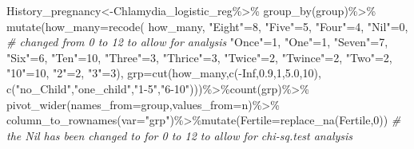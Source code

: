 \documentclass[
]{article}
\newenvironment{Shaded}{\begin{snugshade}}{\end{snugshade}}
\newcommand{\AttributeTok}[1]{\textcolor[rgb]{0.77,0.63,0.00}{#1}}
\newcommand{\CommentTok}[1]{\textcolor[rgb]{0.56,0.35,0.01}{\textit{#1}}}
\newcommand{\ConstantTok}[1]{\textcolor[rgb]{0.00,0.00,0.00}{#1}}
\newcommand{\DecValTok}[1]{\textcolor[rgb]{0.00,0.00,0.81}{#1}}
\newcommand{\FloatTok}[1]{\textcolor[rgb]{0.00,0.00,0.81}{#1}}
\newcommand{\FunctionTok}[1]{\textcolor[rgb]{0.00,0.00,0.00}{#1}}
\newcommand{\NormalTok}[1]{#1}
\newcommand{\OtherTok}[1]{\textcolor[rgb]{0.56,0.35,0.01}{#1}}
\newcommand{\SpecialCharTok}[1]{\textcolor[rgb]{0.00,0.00,0.00}{#1}}
\newcommand{\StringTok}[1]{\textcolor[rgb]{0.31,0.60,0.02}{#1}}
\begin{document}
\begin{Shaded}
\begin{Highlighting}[]
\NormalTok{History\_pregnancy}\OtherTok{\textless{}{-}}\NormalTok{Chlamydia\_logistic\_reg}\SpecialCharTok{\%\textgreater{}\%}
 \FunctionTok{group\_by}\NormalTok{(group)}\SpecialCharTok{\%\textgreater{}\%}
  \FunctionTok{mutate}\NormalTok{(}\AttributeTok{how\_many=}\FunctionTok{recode}\NormalTok{(}
\NormalTok{    how\_many,}
    \StringTok{"Eight"}\OtherTok{=}\DecValTok{8}\NormalTok{,}
    \StringTok{"Five"}\OtherTok{=}\DecValTok{5}\NormalTok{,}
    \StringTok{"Four"}\OtherTok{=}\DecValTok{4}\NormalTok{,}
    \StringTok{"Nil"}\OtherTok{=}\DecValTok{0}\NormalTok{, }\CommentTok{\# changed from 0 to 12 to allow for analysis}
    \StringTok{"Once"}\OtherTok{=}\DecValTok{1}\NormalTok{,}
    \StringTok{"One"}\OtherTok{=}\DecValTok{1}\NormalTok{,}
    \StringTok{"Seven"}\OtherTok{=}\DecValTok{7}\NormalTok{,}
    \StringTok{"Six"}\OtherTok{=}\DecValTok{6}\NormalTok{,}
    \StringTok{"Ten"}\OtherTok{=}\DecValTok{10}\NormalTok{,}
    \StringTok{"Three"}\OtherTok{=}\DecValTok{3}\NormalTok{,}
    \StringTok{"Thrice"}\OtherTok{=}\DecValTok{3}\NormalTok{,}
    \StringTok{"Twice"}\OtherTok{=}\DecValTok{2}\NormalTok{,}
    \StringTok{"Twince"}\OtherTok{=}\DecValTok{2}\NormalTok{,}
    \StringTok{"Two"}\OtherTok{=}\DecValTok{2}\NormalTok{,}
    \StringTok{"10"}\OtherTok{=}\DecValTok{10}\NormalTok{,}
    \StringTok{"2"}\OtherTok{=}\DecValTok{2}\NormalTok{,}
    \StringTok{"3"}\OtherTok{=}\DecValTok{3}\NormalTok{),}
    \AttributeTok{grp=}\FunctionTok{cut}\NormalTok{(how\_many,}\FunctionTok{c}\NormalTok{(}\SpecialCharTok{{-}}\ConstantTok{Inf}\NormalTok{,}\FloatTok{0.9}\NormalTok{,}\DecValTok{1}\NormalTok{,}\FloatTok{5.0}\NormalTok{,}\DecValTok{10}\NormalTok{),}
    \FunctionTok{c}\NormalTok{(}\StringTok{"no\_Child"}\NormalTok{,}\StringTok{"one\_child"}\NormalTok{,}\StringTok{"1{-}5"}\NormalTok{,}\StringTok{"6{-}10"}\NormalTok{)))}\SpecialCharTok{\%\textgreater{}\%}\FunctionTok{count}\NormalTok{(grp)}\SpecialCharTok{\%\textgreater{}\%}
  \FunctionTok{pivot\_wider}\NormalTok{(}\AttributeTok{names\_from=}\NormalTok{group,}\AttributeTok{values\_from=}\NormalTok{n)}\SpecialCharTok{\%\textgreater{}\%}
  \FunctionTok{column\_to\_rownames}\NormalTok{(}\AttributeTok{var=}\StringTok{"grp"}\NormalTok{)}\SpecialCharTok{\%\textgreater{}\%}\FunctionTok{mutate}\NormalTok{(}\AttributeTok{Fertile=}\FunctionTok{replace\_na}\NormalTok{(Fertile,}\DecValTok{0}\NormalTok{))}
\CommentTok{\# the \textquotesingle{}Nil\textquotesingle{} has been changed to for 0 to 12 to allow for chi{-}sq.test analysis}


\end{Highlighting}
\end{Shaded}
\end{document}
